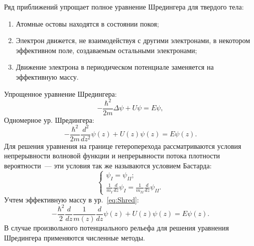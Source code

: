 Ряд приближений упрощает полное уравнение Шредингера для твердого тела:
\begin{enumerate}
	\item Атомные остовы находятся в состоянии покоя;
	\item Электрон движется, не взаимодействуя с другими электронами, в некотором эффективном поле, создаваемым остальными электронами;
	\item Движение электрона в периодическом потенциале заменяется на эффективную массу.
\end{enumerate}
Упрощенное уравнение Шредингера:
\begin{equation}
	\label{eq:ShredGen}
	-\frac{\hbar^{2}}{2m}\Delta\psi + U\psi = E\psi,
\end{equation}
Одномерное ур. Шредингера:
\begin{equation}
	\label{eq:Shred}
	-\frac{\hbar^{2}}{2m}\frac{d^{2}}{dz^{2}}\psi(z) + U(z)\psi(z) = E\psi(z).
\end{equation}
Для решения уравнения на границе гетероперехода рассматриваются условия непрерывности волновой функции и непрерывности потока плотности вероятности~--- эти условия так же называются условием Бастарда:
\begin{equation}
	\label{eq:Bastard}
	\begin{cases}
		\psi_{I} = \psi_{II};\\
		\frac{1}{m_{I}}\frac{d}{dz}\psi_{I} = \frac{1}{m_{II}}\frac{d}{dz}\psi_{II}.
	\end{cases}
\end{equation}
Учтем эффективную массу в ур.~\ref{eq:Shred}:
\begin{equation}
	\label{eq:ShredM}
	-\frac{\hbar^{2}}{2}\frac{d}{dz}\frac{1}{m(z)}\frac{d}{dz}\psi(z) + U(z)\psi(z) = E\psi(z).
\end{equation}
В случае произвольного потенциального рельефа для решения уравнения Шредингера применяются численные методы.